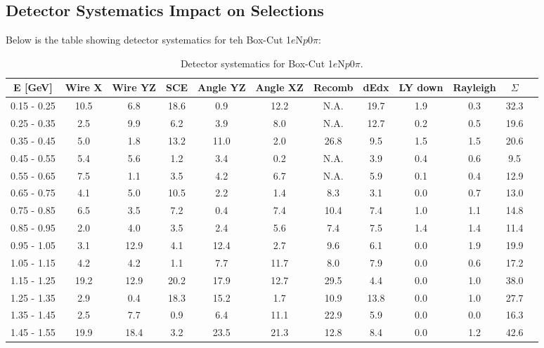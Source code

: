 \documentclass[a4paper]{article}
\newcommand{\npsel}{1$e$N$p$0$\pi$\xspace}
\begin{document}
\subsection{Detector Systematics Impact on Selections}
\label{app:detsys:selections}
\par Below is the table showing detector systematics for teh Box-Cut \npsel:


\begin{table}[H]
\centering
\small
\setlength{\tabcolsep}{3pt}
\renewcommand{\arraystretch}{1.25}
 \begin{tabular}{| c | c | c | c | c | c | c | c | c | c | c | c |} 
 \hline
  E [GeV] & Wire X & Wire YZ & SCE & Angle YZ & Angle XZ & Recomb & dEdx & LY down & Rayleigh & $\Sigma$ \\ \hline
0.15 - 0.25 & 10.5  & 6.8  & 18.6  & 0.9  & 12.2 & N.A. & 19.7  & 1.9  & 0.3  & 32.3 \\
0.25 - 0.35 & 2.5  & 9.9  & 6.2  & 3.9  & 8.0 & N.A. & 12.7  & 0.2  & 0.5  & 19.6 \\
0.35 - 0.45 & 5.0  & 1.8  & 13.2  & 11.0  & 2.0  & 26.8  & 9.5 & 1.5 & 1.5  & 20.6 \\
0.45 - 0.55 & 5.4  & 5.6  & 1.2  & 3.4  & 0.2 & N.A. & 3.9  & 0.4  & 0.6  & 9.5 \\
0.55 - 0.65 & 7.5  & 1.1  & 3.5  & 4.2  & 6.7 & N.A. & 5.9  & 0.1  & 0.4  & 12.9 \\
0.65 - 0.75 & 4.1  & 5.0  & 10.5  & 2.2  & 1.4  & 8.3  & 3.1 & 0.0 & 0.7 & 13.0 \\
0.75 - 0.85 & 6.5  & 3.5  & 7.2  & 0.4  & 7.4  & 10.4  & 7.4 & 1.0 & 1.1 & 14.8 \\
0.85 - 0.95 & 2.0  & 4.0  & 3.5  & 2.4  & 5.6  & 7.4  & 7.5 & 1.4 & 1.4 & 11.4 \\       
0.95 - 1.05 & 3.1  & 12.9  & 4.1  & 12.4  & 2.7  & 9.6  & 6.1 & 0.0 & 1.9 & 19.9 \\     
1.05 - 1.15 & 4.2  & 4.2  & 1.1  & 7.7  & 11.7  & 8.0  & 7.9 & 0.0 & 0.6 & 17.2 \\      
1.15 - 1.25 & 19.2  & 12.9  & 20.2  & 17.9  & 12.7  & 29.5  & 4.4 & 0.0 & 1.0 & 38.0 \\ 
1.25 - 1.35 & 2.9  & 0.4  & 18.3  & 15.2  & 1.7  & 10.9  & 13.8 & 0.0 & 1.0 & 27.7 \\   
1.35 - 1.45 & 2.5  & 7.7  & 0.9  & 6.4  & 11.1  & 22.9  & 5.9 & 0.0 & 0.0 & 16.3 \\    
1.45 - 1.55 & 19.9  & 18.4  & 3.2  & 23.5  & 21.3  & 12.8  & 8.4 & 0.0 & 1.2 & 42.6 \\  
\hline
 \end{tabular}
 \caption{\label{tab:detsys:nue:box} Detector systematics for Box-Cut \npsel.}
\end{table}
\end{document}
